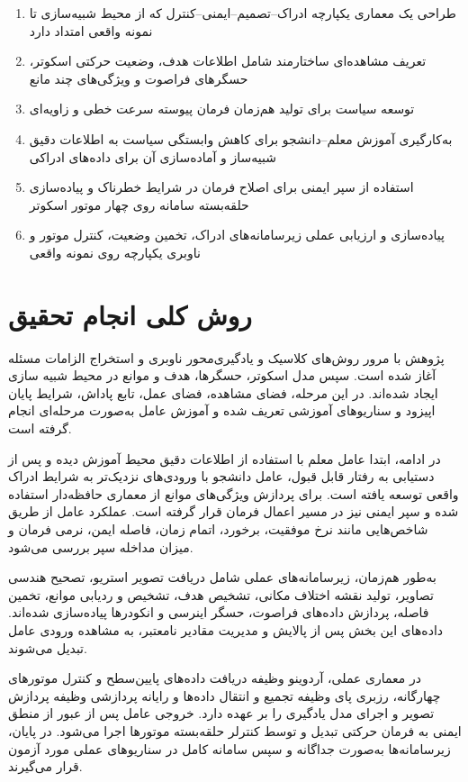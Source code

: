 \begin{enumerate}
    \item طراحی یک معماری یکپارچه ادراک--تصمیم--ایمنی--کنترل که از محیط شبیه‌سازی تا نمونه واقعی امتداد دارد
    \item تعریف مشاهده‌ای ساختارمند شامل اطلاعات هدف، وضعیت حرکتی اسکوتر، حسگرهای فراصوت و ویژگی‌های چند مانع
    \item توسعه سیاست  برای تولید هم‌زمان فرمان پیوسته سرعت خطی و زاویه‌ای
    \item به‌کارگیری آموزش معلم--دانشجو برای کاهش وابستگی سیاست به اطلاعات دقیق شبیه‌ساز و آماده‌سازی آن برای داده‌های ادراکی
    \item استفاده از سپر ایمنی برای اصلاح فرمان در شرایط خطرناک و پیاده‌سازی حلقه‌بسته سامانه روی چهار موتور اسکوتر
    \item پیاده‌سازی و ارزیابی عملی زیرسامانه‌های ادراک، تخمین وضعیت، کنترل موتور و ناوبری یکپارچه روی نمونه واقعی
\end{enumerate}

\section{روش کلی انجام تحقیق}

پژوهش با مرور روش‌های کلاسیک و یادگیری‌محور ناوبری و استخراج الزامات مسئله آغاز شده است. سپس مدل اسکوتر، حسگرها، هدف و موانع در محیط شبیه سازی ایجاد شده‌اند. در این مرحله، فضای مشاهده، فضای عمل، تابع پاداش، شرایط پایان اپیزود و سناریوهای آموزشی تعریف شده و آموزش عامل به‌صورت مرحله‌ای انجام گرفته است.

در ادامه، ابتدا عامل معلم با استفاده از اطلاعات دقیق محیط آموزش دیده و پس از دستیابی به رفتار قابل قبول، عامل دانشجو با ورودی‌های نزدیک‌تر به شرایط ادراک واقعی توسعه یافته است. برای پردازش ویژگی‌های موانع از معماری حافظه‌دار استفاده شده و سپر ایمنی نیز در مسیر اعمال فرمان قرار گرفته است. عملکرد عامل از طریق شاخص‌هایی مانند نرخ موفقیت، برخورد، اتمام زمان، فاصله ایمن، نرمی فرمان و میزان مداخله سپر بررسی می‌شود.

به‌طور هم‌زمان، زیرسامانه‌های عملی شامل دریافت تصویر استریو، تصحیح هندسی تصاویر، تولید نقشه اختلاف مکانی، تشخیص هدف، تشخیص و ردیابی موانع، تخمین فاصله، پردازش داده‌های فراصوت، حسگر اینرسی و انکودرها پیاده‌سازی شده‌اند. داده‌های این بخش پس از پالایش و مدیریت مقادیر نامعتبر، به مشاهده ورودی عامل تبدیل می‌شوند.

در معماری عملی، آردوینو%
 وظیفه دریافت داده‌های پایین‌سطح و کنترل موتورهای چهارگانه، رزبری پای%
  وظیفه تجمیع و انتقال داده‌ها و رایانه پردازشی وظیفه پردازش تصویر و اجرای مدل یادگیری را بر عهده دارد. خروجی عامل پس از عبور از منطق ایمنی به فرمان حرکتی تبدیل و توسط کنترلر حلقه‌بسته موتورها اجرا می‌شود. در پایان، زیرسامانه‌ها به‌صورت جداگانه و سپس سامانه کامل در سناریوهای عملی مورد آزمون قرار می‌گیرند.

